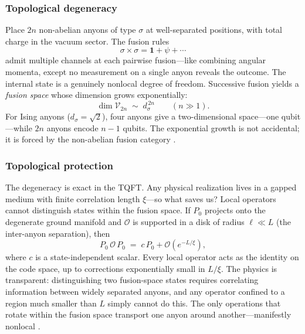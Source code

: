 \subsubsection*{Topological degeneracy}

Place $2n$ non-abelian anyons of type $\sigma$ at well-separated positions, with total charge in the vacuum sector.  The fusion rules
\begin{equation}
  \sigma \times \sigma = \mathbf{1} + \psi + \cdots
  \label{eq:generic-fusion}
\end{equation}
admit multiple channels at each pairwise fusion---like combining angular momenta, except no measurement on a single anyon reveals the outcome.  The internal state is a genuinely nonlocal degree of freedom.  Successive fusion yields a \emph{fusion space} whose dimension grows exponentially:
\begin{equation}
  \dim \mathcal{V}_{2n} \;\sim\; d_\sigma^{\,2n}
  \qquad (n \gg 1).
  \label{eq:topo-degeneracy}
\end{equation}
For Ising anyons ($d_\sigma = \sqrt{2}$), four anyons give a two-dimensional space---one qubit---while $2n$ anyons encode $n-1$ qubits.  The exponential growth is not accidental; it is forced by the non-abelian fusion category \cite{NayakSimonSternFreedmanDasSarma2008NonabelianAnyons}.

\subsubsection*{Topological protection}

The degeneracy is exact in the TQFT.  Any physical realization lives in a gapped medium with finite correlation length $\xi$---so what saves us?  Local operators cannot distinguish states within the fusion space.  If $P_0$ projects onto the degenerate ground manifold and $\mathcal{O}$ is supported in a disk of radius $\ell \ll L$ (the inter-anyon separation), then
\begin{equation}
  P_0 \, \mathcal{O} \, P_0 \;=\; c \, P_0 + \mathcal{O}\!\left(e^{-L/\xi}\right),
  \label{eq:topo-protection}
\end{equation}
where $c$ is a state-independent scalar.  Every local operator acts as the identity on the code space, up to corrections exponentially small in $L/\xi$.  The physics is transparent: distinguishing two fusion-space states requires correlating information between widely separated anyons, and any operator confined to a region much smaller than $L$ simply cannot do this.  The only operations that rotate within the fusion space transport one anyon around another---manifestly nonlocal \cite{Kitaev2003FaultTolerant}.

